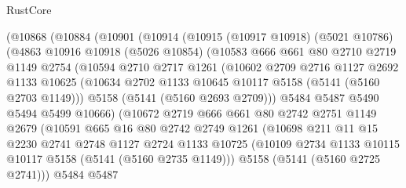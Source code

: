 \begin{lexlean}{RustCore}
\begin{coremodule}
            (@10868
              (@10884
                (@10901
                  (@10914
                    (@10915
                      (@10917 @10918)
                      (@5021 @10786)
                      (@4863
                        @10916
                        @10918
                        (@5026 @10854)
                        (@10583
                          @666
                          @661
                          @80
                          @2710
                          @2719
                          @1149
                          @2754
                          (@10594
                            @2710
                            @2717
                            @1261
                            (@10602
                              @2709
                              @2716
                              @1127
                              @2692
                              @1133
                              @10625
                              (@10634 @2702 @1133 @10645 @10117 @5158 (@5141 (@5160 @2703 @1149)))
                              @5158
                              (@5141 (@5160 @2693 @2709)))
                            @5484
                            @5487
                            @5490
                            @5494
                            @5499
                            @10666)
                          (@10672
                            @2719
                            @666
                            @661
                            @80
                            @2742
                            @2751
                            @1149
                            @2679
                            (@10591
                              @665
                              @16
                              @80
                              @2742
                              @2749
                              @1261
                              (@10698
                                @211
                                @11
                                @15
                                @2230
                                @2741
                                @2748
                                @1127
                                @2724
                                @1133
                                @10725
                                (@10109 @2734 @1133 @10115 @10117 @5158 (@5141 (@5160 @2735 @1149)))
                                @5158
                                (@5141 (@5160 @2725 @2741)))
                              @5484
                              @5487

\end{coremodule}
\end{lexlean}
